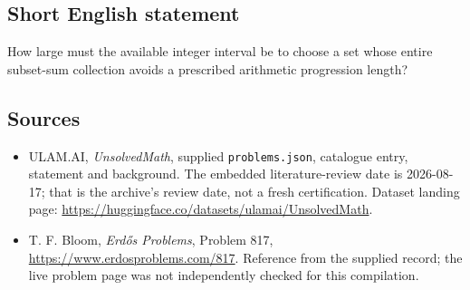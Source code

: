 \documentclass[11pt,a4paper]{article}
\begin{document}
\subsection{Short English statement}

How large must the available integer interval be to choose a set whose entire subset-sum collection avoids a prescribed arithmetic progression length?

\subsection{Sources}

{\small

\begin{itemize}

\item[\hypertarget{source:statement:1}{S1}] ULAM.AI, \emph{UnsolvedMath}, supplied \texttt{problems.json}, catalogue entry, statement and background. The embedded literature-review date is 2026-08-17; that is the archive’s review date, not a fresh certification. Dataset landing page: \url{https://huggingface.co/datasets/ulamai/UnsolvedMath}.

\item[\hypertarget{source:statement:2}{S2}] T. F. Bloom, \emph{Erdős Problems}, Problem 817, \url{https://www.erdosproblems.com/817}. Reference from the supplied record; the live problem page was not independently checked for this compilation.

\end{itemize}

}

\label{end:statement}
\end{document}
